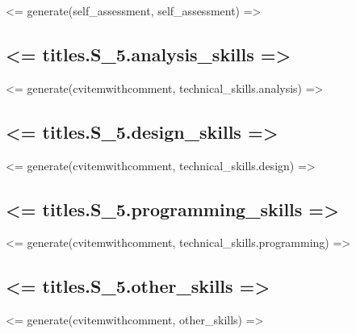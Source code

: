 \documentclass[11pt,a4paper,sans]{moderncv}
\begin{document}

		<= generate(self_assessment, self_assessment) =>




		\subsection{<= titles.S_5.analysis_skills =>}
			<= generate(cvitemwithcomment, technical_skills.analysis) =>
		\subsection{<= titles.S_5.design_skills =>}
			<= generate(cvitemwithcomment, technical_skills.design) =>
		\subsection{<= titles.S_5.programming_skills =>}
			<= generate(cvitemwithcomment, technical_skills.programming) =>
    \subsection{<= titles.S_5.other_skills =>}
		  <= generate(cvitemwithcomment, other_skills) =>




	\renewcommand{\refname}{Articles}		%
	\nocite{*}
	
\end{document}
